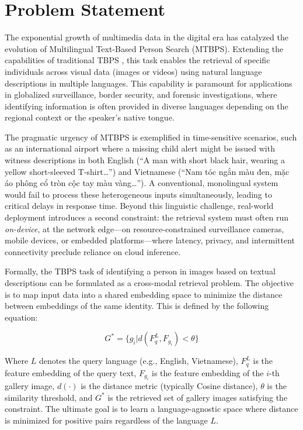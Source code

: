 \documentclass[../main.tex]{subfiles}
\begin{document}
\section{Problem Statement}
\label{sec:problem_statement}

The exponential growth of multimedia data in the digital era has catalyzed the evolution of Multilingual Text-Based Person Search (MTBPS). Extending the capabilities of traditional TBPS \cite{Li_2017_CVPR}, this task enables the retrieval of specific individuals across visual data (images or videos) using natural language descriptions in multiple languages. This capability is paramount for applications in globalized surveillance, border security, and forensic investigations, where identifying information is often provided in diverse languages depending on the regional context or the speaker's native tongue.

\noindent The pragmatic urgency of MTBPS is exemplified in time-sensitive scenarios, such as an international airport where a missing child alert might be issued with witness descriptions in both English (``A man with short black hair, wearing a yellow short-sleeved T-shirt\ldots'') and Vietnamese (``Nam tóc ngắn màu đen, mặc áo phông cổ tròn cộc tay màu vàng\ldots''). A conventional, monolingual system would fail to process these heterogeneous inputs simultaneously, leading to critical delays in response time. Beyond this linguistic challenge, real-world deployment introduces a second constraint: the retrieval system must often run \textit{on-device}, at the network edge---on resource-constrained surveillance cameras, mobile devices, or embedded platforms---where latency, privacy, and intermittent connectivity preclude reliance on cloud inference.

\noindent Formally, the TBPS task of identifying a person in images based on textual descriptions can be formulated as a cross-modal retrieval problem. The objective is to map input data into a shared embedding space to minimize the distance between embeddings of the same identity. This is defined by the following equation:

\begin{equation}
G^{*}=\{g_{i}|d(F_{q}^{L},F_{g_{i}})<\theta\}
\label{eq:1.1}
\end{equation}

Where $L$ denotes the query language (e.g., English, Vietnamese), $F_{q}^{L}$ is the feature embedding of the query text, $F_{g_{i}}$ is the feature embedding of the $i$-th gallery image, $d(\cdot)$ is the distance metric (typically Cosine distance), $\theta$ is the similarity threshold, and $G^{*}$ is the retrieved set of gallery images satisfying the constraint. The ultimate goal is to learn a language-agnostic space where distance is minimized for positive pairs regardless of the language $L$.
\end{document}

